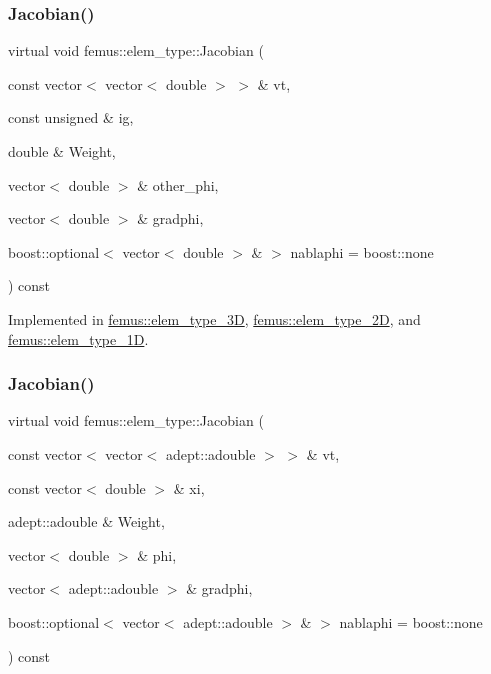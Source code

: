 \subsubsection{\texorpdfstring{Jacobian()}{Jacobian()}\hspace{0.1cm}{\footnotesize\ttfamily [2/4]}}
{\footnotesize\ttfamily virtual void femus\+::elem\+\_\+type\+::\+Jacobian (\begin{DoxyParamCaption}\item[{const vector$<$ vector$<$ double $>$ $>$ \&}]{vt,  }\item[{const unsigned \&}]{ig,  }\item[{double \&}]{Weight,  }\item[{vector$<$ double $>$ \&}]{other\+\_\+phi,  }\item[{vector$<$ double $>$ \&}]{gradphi,  }\item[{boost\+::optional$<$ vector$<$ double $>$ \& $>$}]{nablaphi = {\ttfamily boost\+:\+:none} }\end{DoxyParamCaption}) const\hspace{0.3cm}{\ttfamily [pure virtual]}}



Implemented in \mbox{\hyperlink{classfemus_1_1elem__type__3_d_a83c519de8adf50f547627123db1a82ee}{femus\+::elem\+\_\+type\+\_\+3D}}, \mbox{\hyperlink{classfemus_1_1elem__type__2_d_afa07b600dc9f53257ca5fde905dc6732}{femus\+::elem\+\_\+type\+\_\+2D}}, and \mbox{\hyperlink{classfemus_1_1elem__type__1_d_aec9766e008c3f7536a4a68d87302b254}{femus\+::elem\+\_\+type\+\_\+1D}}.

\mbox{\label{classfemus_1_1elem__type_a2d76133387cebf896c0e51459055fdea}} 
\subsubsection{\texorpdfstring{Jacobian()}{Jacobian()}\hspace{0.1cm}{\footnotesize\ttfamily [3/4]}}
{\footnotesize\ttfamily virtual void femus\+::elem\+\_\+type\+::\+Jacobian (\begin{DoxyParamCaption}\item[{const vector$<$ vector$<$ adept\+::adouble $>$ $>$ \&}]{vt,  }\item[{const vector$<$ double $>$ \&}]{xi,  }\item[{adept\+::adouble \&}]{Weight,  }\item[{vector$<$ double $>$ \&}]{phi,  }\item[{vector$<$ adept\+::adouble $>$ \&}]{gradphi,  }\item[{boost\+::optional$<$ vector$<$ adept\+::adouble $>$ \& $>$}]{nablaphi = {\ttfamily boost\+:\+:none} }\end{DoxyParamCaption}) const\hspace{0.3cm}{\ttfamily [pure virtual]}}



